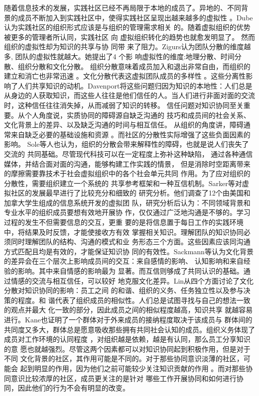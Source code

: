随着信息技术的发展，实践社区已经不再局限于本地的成员了。异地的、不同背
景的成员不断加入到实践社区中，使得实践社区呈现出越来越多的虚拟性
\cite{preece2004eea}。Dube认为实践社区的组织形式应该是与组织的管理需求相关
的\cite{dube2006ttv}。随着虚拟组织的优势被更多的管理者所认同，实践社区
向
虚拟组织转化的趋势也就愈发明显了。  然而组织的虚拟性却为知识的共享与协
同带
来了阻力。Zigurs认为团队分散的维度越多, 团队的虚拟性就越大。她提出了4 个影
响虚拟性的维度:地理分散、时间分散、组织分散和文化分散\cite{ZIGURS2003}。
组织分散意味着成员加入和退出非常自由，而组织的建立和消亡也非常迅速
\cite{655269}。文化分散代表这虚拟团队成员的多样性
\cite{huangyouliandliutuanjie}。这些分离性影响了人们共享知识的动机。Davenport将这些问题归因为知识的本地性：人们总是
从身边的人获取知识，而这些人往往是他们信任的人。当人们进行非面对面的交流
时，这种信任往往消失掉，从而减弱了知识的转移\cite{davenport1998wko}。
信任问题对知识协同至关重要。从个人角度说，实质协同的障碍源自缺乏沟通的
技巧和成员间的社会关系、文化背景上的差异、以及缺乏沟通的时间与相互信任。
从组织的角度讲，障碍通常来自缺乏必要的基础设施和资源
\cite{riege2005tdk}。而社区的分散性实际增强了这些负面因素的影响。
Sole等人也认为，组织的分散会带来解释性的障碍，也就是说人们丧失了交流的
共同基础\cite{sole2000bkg}。尽管现代科技可以在一定程度上弥补这种缺陷，
通过各种通信媒体，并结合面对面的沟通，能够构建工作实践的情景\cite{robey2000slc}，
但是消除时空距离带来的摩擦需要靠技术于社会虚拟组织中的各个社会单元共同
作用\cite{sarker2004isa}。为了应对组织的分散性，需要组织建立一个系统的
共享参考框架和一种互信机制。Sarker等对虚拟社区的发展最早进行了比较充分和细致的
研究分析\cite{sarker2000uvt}。他们调查了12个由美国和加拿大学生组成的信息系统开发的虚拟团
队，研究分析后认为：不同领域背景和专业水平的组织成员要想有效地开展协
作，仅仅通过广泛地沟通是不够的。学习过程的发生不但需要信息的交互，更重
要的是将信息置于每日工作的实践环境中，将结果及时反馈，才能使接收方有效
掌握相关知识。理解团队的知识协同必须同时理解团队的结构、沟通的模式和业
务形态三个方面。这些因素应该同沟通方式匹配且均是有效的，才能保证知识协
同的有效性。Sackmann等认为文化背景的差异会在三个层次上影响成员间的交互：来自感情的影响、
认知影响和来自经验的影响\cite{sackmann2007eci}。其中来自情感的影响最为
显著。而互信则够成了共同认识的基础。通过情感的交流与相互信任，可以较好
地克服文化差异。Lin从四个方面讨论了文化分散对知识协同的影响：员工之间
的和谐、组织的义务、任务独立性以及参与决策的程度\cite{lin2007son}。和
谐代表了组织成员的相似性。人们总是试图寻找与自己的想法一致的观点并最大
化一致的部分\cite{vianen2000pof}，因此成员之间的相似程度越高，知识共享
就越容易进行。Kane也证明了一个群体对于外来成员的接纳程度取决于该成员与
群体间的共同度又多大，群体总是愿意吸收那些拥有共同社会认知的成员\cite{Kanea2005}。组织义务体现了成员对工作环境的认同程度
\cite{testa2001ocj}，对组织越是依赖，越是有认同，那么员工分享知识的意
愿也就越强烈。尽管这两个因素都可以对知识协同起到积极作用，但是对于不同
文化背景的社区，其作用可能是不同的。对于那些协同意识淡薄的社区，可能会
起到明显的作用，因为他们之前可能较少关注知识贡献的作用
\cite{witt2001iep}。而对那些协同意识比较浓厚的社区，成员更关注的是针对
哪些工作开展协同和如何进行协同，因此他们的行为不会有明显的改变\cite{eisenberger2001rpo}。



